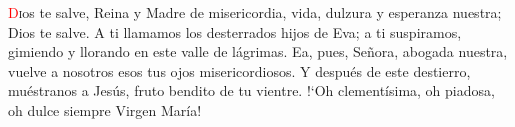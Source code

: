 \lettrine[lines=2, ]{\textcolor{red}{D}}ios te salve, Reina y Madre de misericordia, vida, dulzura y esperanza nuestra; Dios te salve.
A ti llamamos los desterrados hijos de Eva; a ti suspiramos, gimiendo y llorando en este valle de lágrimas.
Ea, pues, Señora, abogada nuestra, vuelve a nosotros esos tus ojos misericordiosos. Y después de este destierro, muéstranos a Jesús,
fruto bendito de tu vientre. {!`}Oh clementísima, oh piadosa, oh dulce siempre Virgen María!